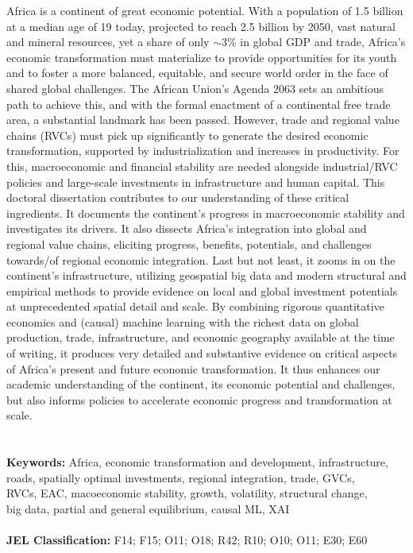 \documentclass[openany]{book}
\begin{document}
\begin{titlepage}
\begin{center}
        \vspace{0.5cm}
        \begin{minipage}{0.9\textwidth}
            \normalsize
            \hphantom{aa.}Africa is a continent of great economic potential. With a population of 1.5 billion at a median age of 19 today, projected to reach 2.5 billion by 2050, vast natural and mineral resources, yet a share of only $\sim$3\% in global GDP and trade, Africa's economic transformation must materialize to provide opportunities for its youth and to foster a more balanced, equitable, and secure world order in the face of shared global challenges. The African Union's Agenda 2063 sets an ambitious path to achieve this, and with the formal enactment of a continental free trade area, a substantial landmark has been passed. However, trade and regional value chains (RVCs) must pick up significantly to generate the desired economic transformation, supported by industrialization and increases in productivity. For this, macroeconomic and financial stability are needed alongside industrial/RVC policies and large-scale investments in infrastructure and human capital. This doctoral dissertation contributes to our understanding of these critical ingredients. It documents the continent's progress in macroeconomic stability and investigates its drivers. It also dissects Africa's integration into global and regional value chains, eliciting progress, benefits, potentials, and challenges towards/of regional economic integration. Last but not least, it zooms in on the continent's infrastructure, utilizing geospatial big data and modern structural and empirical methods to provide evidence on local and global investment potentials at unprecedented spatial detail and scale. By combining rigorous quantitative economics and (causal) machine learning with the richest data on global production, trade, infrastructure, and economic geography available at the time of writing, it produces very detailed and substantive evidence on critical aspects of Africa's present and future economic transformation. It thus enhances our academic understanding of the continent, its economic potential and challenges, but also informs policies to accelerate economic progress and transformation at scale. \\\\\\
\noindent \textbf{Keywords:} Africa, economic transformation and development, infrastructure,\\\hphantom{a a a a a a a.}roads, spatially optimal investments, regional integration, trade, GVCs,\\\hphantom{a a a a a a a.}RVCs, EAC, macoeconomic stability, growth, volatility, structural change,\\\hphantom{a a a a a a a.}big data, partial and general equilibrium, causal ML, XAI\\\\
\textbf{JEL Classification:} F14; F15; O11; O18; R42; R10; O10; O11; E30; E60
        \end{minipage}
    \end{center}
    \vspace*{\fill}
\end{titlepage}
\end{document}
